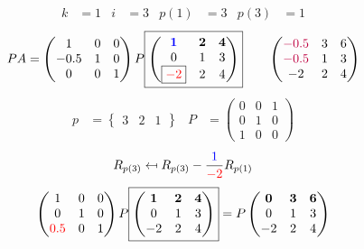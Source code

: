 \documentclass[pdf]{beamer}
\begin{document}
\begin{frame}{}\begin{align*} k &= 1 & i &= 3 & p(1) &= 3 & p(3) &= 1\end{align*} $$PA=\begin{pmatrix}1&0&0\\-0.5&1&0\\0&0&1\end{pmatrix} P \boxed{\begin{pmatrix}\mathbf{{\color{blue}1}}&\mathbf{2}&\mathbf{4}\\0&1&3\\\boxed{{\color{red}-2}}&2&4\end{pmatrix}} \quad\quad \begin{pmatrix}{\color{purple}-0.5}&3&6\\{\color{purple}-0.5}&1&3\\-2&2&4\end{pmatrix}$$ \begin{align*} p&= \begin{Bmatrix}3&2&1\end{Bmatrix} & P&= \begin{pmatrix}0&0&1\\0&1&0\\1&0&0\end{pmatrix} \end{align*} $$R_{p(3)} \mapsfrom R_{p(3)} - \frac{{\color{blue}1}}{{\color{red}-2}} R_{p(1)}$$ $$ \begin{pmatrix}1&0&0\\0&1&0\\{\color{red}0.5}&0&1\end{pmatrix} P \boxed{\begin{pmatrix}\mathbf{1}&\mathbf{2}&\mathbf{4}\\0&1&3\\-2&2&4\end{pmatrix}} = P \begin{pmatrix}\mathbf{0}&\mathbf{3}&\mathbf{6}\\0&1&3\\-2&2&4\end{pmatrix} $$\end{frame}
\end{document}

